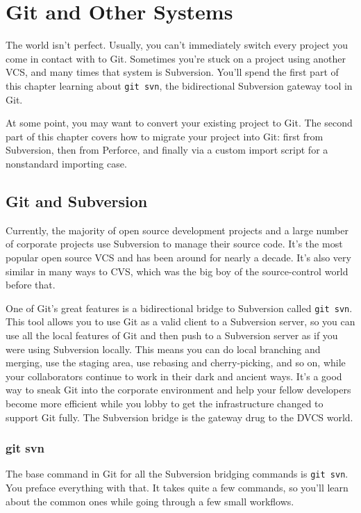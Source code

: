 \documentclass[a4paper]{book}
\newcommand{\chap}[1]{\newpage\thispagestyle{empty}\chapter{#1}\label{chap:\thechapter}}
\begin{document}
\chap{Git and Other Systems}

The world isn't perfect. Usually, you can't immediately switch every project you come in contact with to Git. Sometimes you're stuck on a project using another VCS, and many times that system is Subversion. You'll spend the first part of this chapter learning about \texttt{git svn}, the bidirectional Subversion gateway tool in Git.

At some point, you may want to convert your existing project to Git. The second part of this chapter covers how to migrate your project into Git: first from Subversion, then from Perforce, and finally via a custom import script for a nonstandard importing case.

\section{Git and Subversion}

Currently, the majority of open source development projects and a large number of corporate projects use Subversion to manage their source code. It's the most popular open source VCS and has been around for nearly a decade. It's also very similar in many ways to CVS, which was the big boy of the source-control world before that.

One of Git's great features is a bidirectional bridge to Subversion called \texttt{git svn}. This tool allows you to use Git as a valid client to a Subversion server, so you can use all the local features of Git and then push to a Subversion server as if you were using Subversion locally. This means you can do local branching and merging, use the staging area, use rebasing and cherry-picking, and so on, while your collaborators continue to work in their dark and ancient ways. It's a good way to sneak Git into the corporate environment and help your fellow developers become more efficient while you lobby to get the infrastructure changed to support Git fully. The Subversion bridge is the gateway drug to the DVCS world.

\subsection{git svn}

The base command in Git for all the Subversion bridging commands is \texttt{git svn}. You preface everything with that. It takes quite a few commands, so you'll learn about the common ones while going through a few small workflows.
\end{document}

